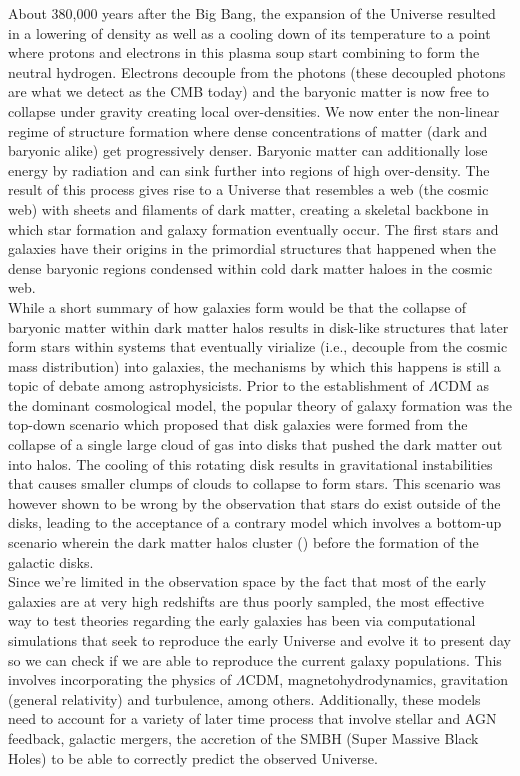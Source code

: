 About 380,000 years after the Big Bang, the expansion of the Universe resulted in a lowering of density as well as a cooling down of its temperature to a point where protons and electrons in this plasma soup start combining to form the neutral hydrogen. Electrons decouple from the photons (these decoupled photons are what we detect as the CMB today) and the baryonic matter is now free to collapse under gravity creating local over-densities. We now enter the non-linear regime of structure formation where dense concentrations of matter (dark and baryonic alike) get progressively denser. Baryonic matter can additionally lose energy by radiation and can sink further into regions of high over-density. The result of this process gives rise to a Universe that resembles a web (the cosmic web) with sheets and filaments of dark matter, creating a skeletal backbone in which star formation and galaxy formation eventually occur. The first stars and galaxies have their origins in the primordial structures that happened when the dense baryonic regions condensed within cold dark matter haloes in the cosmic web.\\

While a short summary of how galaxies form would be that the collapse of baryonic matter within dark matter halos results in disk-like structures that later form stars within systems that eventually virialize (i.e., decouple from the cosmic mass distribution) into galaxies, the mechanisms by which this happens is still a topic of debate among astrophysicists.  Prior to the establishment of $\Lambda$CDM as the dominant cosmological model, the popular theory of galaxy formation was the top-down scenario \citep{1978ApJ...225..357S} which proposed that disk galaxies were formed from the collapse of a single large cloud of gas \citep{1962ApJ...136..748E} into disks that pushed the dark matter out into halos. The cooling of this rotating disk results in gravitational instabilities that causes smaller clumps of clouds to collapse to form stars. This scenario was however shown to be wrong by the observation that stars do exist outside of the disks, leading to the acceptance of a contrary model which involves a bottom-up scenario wherein the dark matter halos cluster (\citet{0004-637X-490-2-493, 2015PNAS..11212249W}) before the formation of the galactic disks.\\

Since we're limited in the observation space by the fact that most of the early galaxies are at very high redshifts are thus poorly sampled, the most effective way to test theories regarding the early galaxies has been via computational simulations that seek to reproduce the early Universe and evolve it to present day so we can check if we are able to reproduce the current galaxy populations. This involves incorporating the physics of $\Lambda$CDM, magnetohydrodynamics, gravitation (general relativity) and turbulence, among others. Additionally, these models need to account for a variety of later time process that involve stellar and AGN feedback, galactic mergers, the accretion of the SMBH (Super Massive Black Holes) to be able to correctly predict the observed Universe.\\


